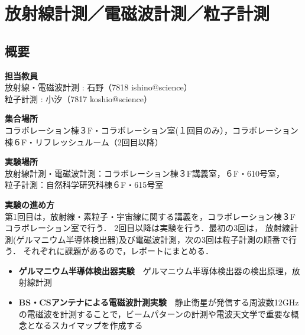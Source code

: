 \documentclass[a4j,10pt,oneside,openany]{jsbook}
\begin{document}
\chapter{放射線計測／電磁波計測／粒子計測}%

\section{概要}
\begin{description}
  \item {\bf 担当教員}\\
  \hspace{1em}放射線・電磁波計測 : 石野（7818 ishino@science）\\
  \hspace{1em}粒子計測 : 小汐（7817 koshio@science）
  \item {\bf 集合場所}\\
  \hspace{1em}コラボレーション棟３F・コラボレーション室(１回目のみ），コラボレーション棟６F・リフレッシュルーム（2回目以降）
  \item {\bf 実験場所}\\
  \hspace{1em}放射線計測・電磁波計測：コラボレーション棟３F講義室，６F・610号室，\\
  \hspace{1em}粒子計測：自然科学研究科棟６F・615号室
  \item {\bf 実験の進め方}\\
  \hspace{1em}第1回目は，放射線・素粒子・宇宙線に関する講義を，コラボレーション棟３Fコラボレーション室で行う．
  2回目以降は実験を行う．最初の3回は，
  放射線計測(ゲルマニウム半導体検出器)及び電磁波計測，次の3回は粒子計測の順番で行う．
  それぞれに課題があるので，レポートにまとめる．
  \begin{itemize}
    \item {\bf ゲルマニウム半導体検出器実験}~~ゲルマニウム半導体検出器の検出原理，放射線計測
    \item {\bf BS・CSアンテナによる電磁波計測実験}~~静止衛星が発信する周波数12GHzの電磁波を計測することで，ビームパターンの計測や電波天文学で重要な概念となるスカイマップを作成する

\end{itemize}
\end{description}
\end{document}
